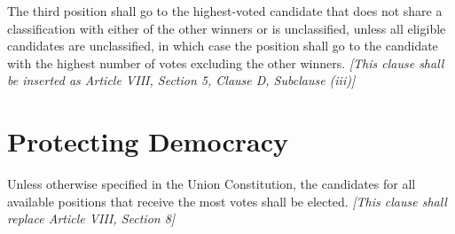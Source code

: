 \documentclass{uniondoc}
\begin{document}
The third position shall go to the highest-voted candidate that does not share a classification with either of the other winners or is unclassified, unless all eligible candidates are unclassified, in which case the position shall go to the candidate with the highest number of votes excluding the other winners.
\textit{[This clause shall be inserted as Article VIII, Section 5, Clause D, Subclause (iii)]}

\section{Protecting Democracy}
Unless otherwise specified in the Union Constitution, the candidates for all available positions that receive the most votes shall be elected.
\textit{[This clause shall replace Article VIII, Section 8]}
\end{document}
